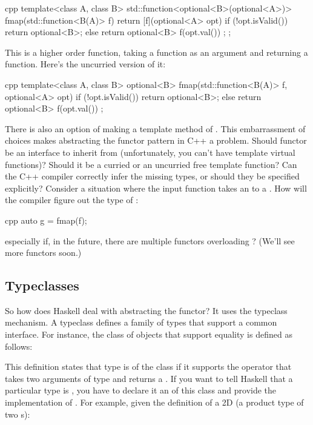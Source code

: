 \begin{snip}{cpp}
template<class A, class B>
std::function<optional<B>(optional<A>)>
fmap(std::function<B(A)> f) {
    return [f](optional<A> opt) {
        if (!opt.isValid())
            return optional<B>{};
        else
            return optional<B>{ f(opt.val()) };
    };
}
\end{snip}
This is a higher order function, taking a function as an argument and
returning a function. Here's the uncurried version of it:

\begin{snip}{cpp}
template<class A, class B>
optional<B> fmap(std::function<B(A)> f, optional<A> opt) {
    if (!opt.isValid())
        return optional<B>{};
    else
        return optional<B>{ f(opt.val()) };
}
\end{snip}
There is also an option of making  a template method of
. This embarrassment of choices makes abstracting the
functor pattern in C++ a problem. Should functor be an interface to
inherit from (unfortunately, you can't have template virtual functions)?
Should it be a curried or an uncurried free template function? Can the
C++ compiler correctly infer the missing types, or should they be
specified explicitly? Consider a situation where the input function
 takes an  to a . How will the
compiler figure out the type of :

\begin{snip}{cpp}
auto g = fmap(f);
\end{snip}
especially if, in the future, there are multiple functors overloading
? (We'll see more functors soon.)

\subsection{Typeclasses}

So how does Haskell deal with abstracting the functor? It uses the
typeclass mechanism. A typeclass defines a family of types that support
a common interface. For instance, the class of objects that support
equality is defined as follows:

This definition states that type  is of the class 
if it supports the operator \code{(==)} that takes two arguments of
type  and returns a . If you want to tell Haskell
that a particular type is , you have to declare it an
 of this class and provide the implementation of
\code{(==)}. For example, given the definition of a 2D 
(a product type of two s):


